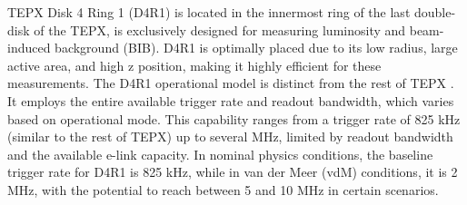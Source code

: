 TEPX Disk 4 Ring 1 (D4R1) is located in the innermost ring of the last double-disk of the TEPX, is exclusively designed for measuring luminosity and beam-induced background (BIB). D4R1 is optimally placed due to its low radius, large active area, and high z position, making it highly efficient for these measurements. The D4R1 operational model is distinct from the rest of TEPX \cite{Haranko2023}. It employs the entire available trigger rate and readout bandwidth, which varies based on operational mode. This capability ranges from a trigger rate of 825 kHz (similar to the rest of TEPX) up to several MHz, limited by readout bandwidth and the available e-link capacity. In nominal physics conditions, the baseline trigger rate for D4R1 is 825 kHz, while in van der Meer (vdM) conditions, it is 2 MHz, with the potential to reach between 5 and 10 MHz in certain scenarios. 



